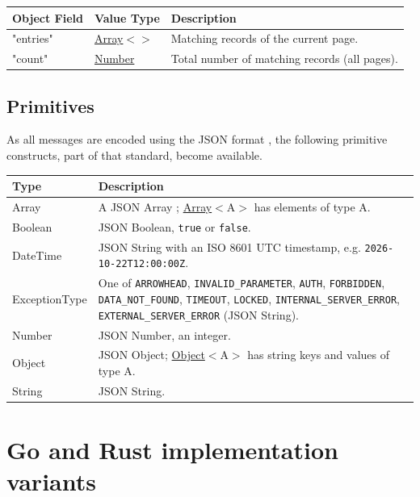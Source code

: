 \documentclass[a4paper]{arrowhead}
\newcommand{\mref}[2][]{{\textcolor{ArrowheadPurple}{\hyperref[sec:model:#2]{\ifstrempty{#1}{#2}{#1}}}}}
\newcommand{\pdef}[1]{{\textcolor{ArrowheadGrey}{#1 \label{sec:model:primitives:#1} \label{sec:model:primitives:#1s}}}}
\newcommand{\pref}[1]{{\textcolor{ArrowheadGrey}{\hyperref[sec:model:primitives:#1]{#1}}}}
\begin{document}
\noindent\begin{tabularx}{\textwidth}{| >{\raggedright\arraybackslash}p{3.9cm} | >{\raggedright\arraybackslash\small}p{5.3cm} | X |} \hline
\rowcolor{gray!33} Object Field & Value Type & Description \\ \hline
"entries" & \pref{Array}$<$\allowbreak{}\mref{BlacklistEntry}$>$ & Matching records of the current page. \\ \hline
"count" & \pref{Number} & Total number of matching records (all pages). \\ \hline
\end{tabularx}



\subsection{Primitives}
\label{sec:model:primitives}

As all messages are encoded using the JSON format \cite{rfc8259}, the following primitive constructs, part of that standard, become available.

\noindent\begin{tabularx}{\textwidth}{| p{4.6cm} | X |} \hline
\rowcolor{gray!33} Type & Description \\ \hline
\pdef{Array} & A JSON Array \cite{rfc8259}; \pref{Array}$<$A$>$ has elements of type A. \\ \hline
\pdef{Boolean} & JSON Boolean, \texttt{true} or \texttt{false}. \\ \hline
\pdef{DateTime} & JSON String with an ISO 8601 UTC timestamp, e.g. \texttt{2026-10-22T12:00:00Z}. \\ \hline
\pdef{ExceptionType} & One of \texttt{ARROWHEAD}, \texttt{INVALID\_\allowbreak{}PARAMETER}, \texttt{AUTH}, \texttt{FORBIDDEN}, \texttt{DATA\_\allowbreak{}NOT\_\allowbreak{}FOUND}, \texttt{TIMEOUT}, \texttt{LOCKED}, \texttt{INTERNAL\_\allowbreak{}SERVER\_\allowbreak{}ERROR}, \texttt{EXTERNAL\_\allowbreak{}SERVER\_\allowbreak{}ERROR} (JSON String). \\ \hline
\pdef{Number} & JSON Number, an integer. \\ \hline
\pdef{Object} & JSON Object; \pref{Object}$<$A$>$ has string keys and values of type A. \\ \hline
\pdef{String} & JSON String. \\ \hline
\end{tabularx}

\newpage

\section{Go and Rust implementation variants}
\end{document}
